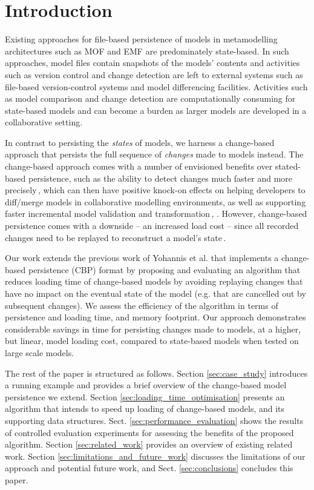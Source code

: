 \documentclass{llncs}
\begin{document}
\section{Introduction}
\label{sec:introduction}
Existing approaches for file-based persistence of models in metamodelling architectures such as MOF and EMF are predominately state-based. In such approaches, model files contain snapshots of the models' contents and activities such as version control and change detection are left to external systems such as file-based version-control systems and model differencing facilities. Activities such as model comparison and change detection are computationally consuming for state-based models and can become a burden as larger models are developed in a collaborative setting. 

In contrast to persisting the \emph{states} of models, we harness a change-based approach that persists the full sequence of \emph{changes} made to models instead. The change-based approach comes with a number of envisioned benefits over stated-based persistence, such as the ability to detect changes much faster and more precisely\,\cite{yohannis2017turning}, which can then have positive knock-on effects on helping developers to diff/merge models in collaborative modelling environments, as well as supporting faster incremental model validation and transformation\,\cite{rath2012derived}, \cite{ogunyomi2015property}. However, change-based persistence comes with a downside -- an increased load cost -- since all recorded changes need to be replayed to reconstruct a model's state\,\cite{yohannis2017turning}.   

Our work extends the previous work of Yohannis et al. \cite{yohannis2017turning} that implements a change-based persistence (CBP) format by proposing and evaluating an algorithm that reduces loading time of change-based models by avoiding replaying changes that have no impact on the eventual state of the model (e.g. that are cancelled out by subsequent changes). We assess the efficiency of the algorithm in terms of persistence and loading time, and memory footprint. Our approach demonstrates considerable savings in time for persisting changes made to models, at a higher, but linear, model loading cost, compared to state-based models when tested on large scale models. %

The rest of the paper is structured as follows. Section \ref{sec:case_study} introduces a running example and provides a brief overview of the change-based model persistence we extend. Section \ref{sec:loading_time_optimisation} presents an algorithm that intends to speed up loading of change-based models, and its supporting data structures. %
Sect. \ref{sec:performance_evaluation} shows the results of controlled evaluation experiments for assessing the benefits of the proposed algorithm. Section \ref{sec:related_work} provides an overview of existing related work. Section \ref{sec:limitations_and_future_work} discusses the limitations of our approach and potential future work, and Sect. \ref{sec:conclusions} concludes this paper.
\end{document}
